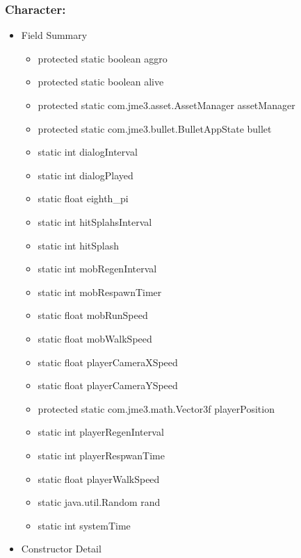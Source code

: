 \documentclass[letterpaper]{article}
\begin{document}
						\vspace{0.2in}
						\subsubsection*{Character:}
						\vspace{0.1in}
						
							\begin{itemize}
								\item	Field Summary
										\begin{itemize}
											\item	protected static boolean	aggro 
											\item	protected static boolean	alive 
											\item	protected static com.jme3.asset.AssetManager	assetManager 
											\item	protected static com.jme3.bullet.BulletAppState	bullet 
											\item	static int	dialogInterval 
											\item	static int	dialogPlayed 
											\item	static float	eighth\_pi 
											\item	static int	hitSplahsInterval 
											\item	static int	hitSplash 
											\item	static int	mobRegenInterval 
											\item	static int	mobRespawnTimer 
											\item	static float	mobRunSpeed 
											\item	static float	mobWalkSpeed 
											\item	static float	playerCameraXSpeed 
											\item	static float	playerCameraYSpeed 
											\item	protected static com.jme3.math.Vector3f	playerPosition 
											\item	static int	playerRegenInterval 
											\item	static int	playerRespwanTime 
											\item	static float	playerWalkSpeed 
											\item	static java.util.Random	rand 
											\item	static int	systemTime 
										\end{itemize}
								\item	Constructor Detail \\

\end{itemize}
\end{document}
